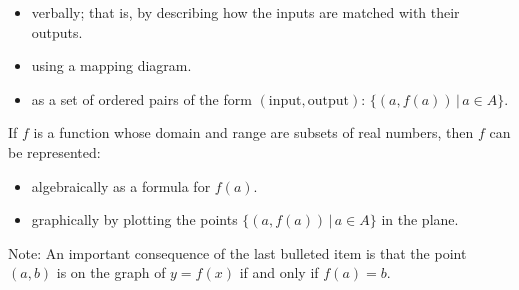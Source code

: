\documentclass{ximera}
\begin{document}
\begin{itemize}

\item  verbally; that is, by describing how the inputs are matched with their outputs.

\item using a mapping diagram.

\item  as a set of ordered pairs of the form $(\text{input}, \text{output})$:  $\{ (a, f(a)) \, | \, a \in A \}$.

\end{itemize}

If $f$ is a function whose domain and range are subsets of real numbers, then $f$ can be represented:

\begin{itemize}

\item  algebraically as a formula for $f(a)$.

\item  graphically by plotting the points $\{ (a, f(a))  \, | \, a \in A \}$ in the plane.

\end{itemize}

Note: An important consequence of the last bulleted item is that the point $(a, b)$ is on the graph of $y = f(x)$ if and only if $f(a) = b.$\label{FundamentalGraphingPrinciple}
\end{document}
